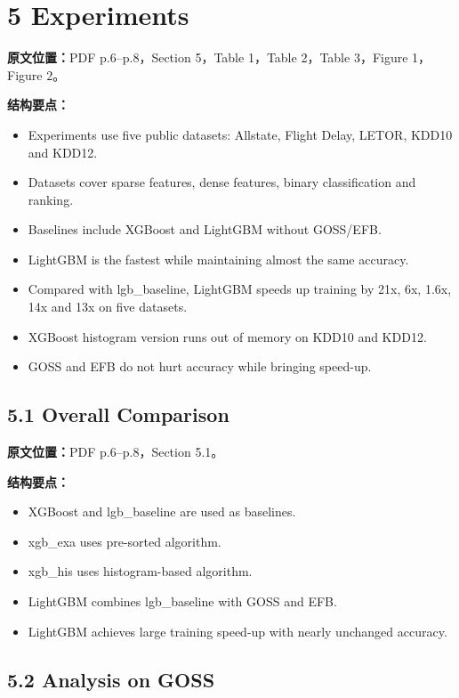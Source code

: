 \section{5 Experiments}

\textbf{原文位置：}PDF p.6--p.8，Section 5，Table 1，Table 2，Table 3，Figure 1，Figure 2。

\textbf{结构要点：}
\begin{itemize}
  \item Experiments use five public datasets: Allstate, Flight Delay, LETOR, KDD10 and KDD12.
  \item Datasets cover sparse features, dense features, binary classification and ranking.
  \item Baselines include XGBoost and LightGBM without GOSS/EFB.
  \item LightGBM is the fastest while maintaining almost the same accuracy.
  \item Compared with lgb\_baseline, LightGBM speeds up training by 21x, 6x, 1.6x, 14x and 13x on five datasets.
  \item XGBoost histogram version runs out of memory on KDD10 and KDD12.
  \item GOSS and EFB do not hurt accuracy while bringing speed-up.
\end{itemize}

\subsection{5.1 Overall Comparison}

\textbf{原文位置：}PDF p.6--p.8，Section 5.1。

\textbf{结构要点：}
\begin{itemize}
  \item XGBoost and lgb\_baseline are used as baselines.
  \item xgb\_exa uses pre-sorted algorithm.
  \item xgb\_his uses histogram-based algorithm.
  \item LightGBM combines lgb\_baseline with GOSS and EFB.
  \item LightGBM achieves large training speed-up with nearly unchanged accuracy.
\end{itemize}

\subsection{5.2 Analysis on GOSS}

